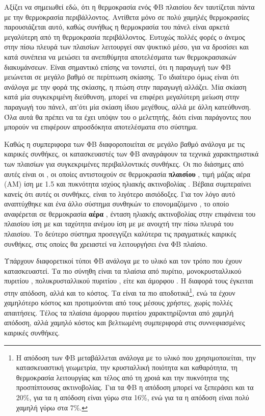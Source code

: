 \documentclass[12pt]{report}
\begin{document}
Αξίζει να σημειωθεί εδώ, ότι η θερμοκρασία ενός ΦΒ πλαισίου δεν ταυτίζεται πάντα με την θερμοκρασία περιβάλλοντος. Αντίθετα μόνο σε πολύ χαμηλές θερμοκρασίες παρουσιάζεται αυτό, καθώς συνήθως η θερμοκρασία του πάνελ είναι αρκετά 
μεγαλύτερη από τη θερμοκρασία περιβάλλοντος. Ευτυχώς πολλές φορές ο άνεμος στην πίσω πλευρά των πλαισίων λειτουργεί σαν ψυκτικό μέσο, για να δροσίσει και κατά συνέπεια να μειώσει τα ανεπιθύμητα αποτελέσματα των θερμοκρασιακών 
διακυμάνσεων. Είναι σημαντικό επίσης να τονιστεί, ότι η παραγωγή των ΦΒ μειώνεται σε μεγάλο βαθμό σε περίπτωση σκίασης. Το ιδιαίτερο όμως είναι ότι ανάλογα με την φορά της σκίασης, η πτώση στην παραγωγή αλλάζει. Μία σκίαση κατά μία 
συγκεκριμένη διεύθυνση, μπορεί να επιφέρει μεγαλύτερη μείωση στην παραγωγή του πάνελ, απ'ότι μία σκίαση ίδιου μεγέθους, αλλά με άλλη κατεύθυνση. Όλα αυτά θα πρέπει να τα έχει υπόψιν του ο μελετητής, διότι είναι παράγοντες που μπορούν
να επιφέρουν απροσδόκητα αποτελέσματα στο σύστημα. 

Καθώς η συμπεριφορα των ΦΒ διαφοροποιείται σε μεγάλο βαθμό ανάλογα με τις καιρικές συνθήκες, οι κατασκευαστές των ΦΒ αναγράφουν τα τεχνικά χαρακτηριστικά των πλαισίων για συγκεκριμένες περιβαλλοντικές συνθήκες. Οι πιο διάσημες
από αυτές είναι οι {}, οι οποίες αντιστοιχούν σε θερμοκρασία \textbf{πλαισίου} {}, τιμή μάζας αέρα (ΑΜ) ίση με 1.5 και πυκνότητα ισχύος ηλιακής ακτινοβολίας 
{}. Βέβαια συμπεραίνει κανείς ότι αυτές οι συνθήκες, είναι το λιγότερο αισιόδοξες. Για τον λόγο αυτό αναπτύχθηκε και ένα άλλο σύστημα συνθηκών το επονομαζόμενο 
{}, το οποίο αναφέρεται σε θερμοκρασία \textbf{αέρα} {}, ένταση ηλιακής ακτινοβολίας στην επιφάνεια του πλαισίου ίση με {} 
και ταχύτητα ανέμου ίση με {} με ανοιχτή την πίσω πλευρά του πλαισίου. Το δεύτερο σύστημα προσεγγίζει καλύτερα τις πραγματικές καιρικές συνθήκες, στις οποίες θα χρειαστεί να λειτουργήσει ένα ΦΒ πλαίσιο. 

Υπάρχουν διαφορετικοί τύποι ΦΒ ανάλογα με το υλικό και τον τρόπο που έχουν κατασκευαστεί. Τα πιο σύνηθη είναι τα πλαίσια από πυρίτιο, μονοκρυσταλλικού πυριτίου {}, πολυκρυσταλλικού πυριτίου {}, 
είτε και άμορφου {}. Η διαφορά τους έγκειται στην απόδοση, αλλά και το κόστος. Τα {} είναι τα πιο αποδοτικά\footnote{Η απόδοση των ΦΒ μεταβάλλεται ανάλογα με το υλικό που χρησιμοποιείται, την
κατασκευαστική γεωμετρία, την κρυσταλλική ποιότητα και καθαρότητα, τη θερμοκρασία λειτουργίας και τέλος από τη χροιά και την πυκνότητα της προσπίπτουσας ακτινοβολίας. Για τα {}
ΦΒ η απόδοση μπορεί να ξεπεράσει και τα 20\%, για τα {} η απόδοση είναι γύρω στα 16\%, ενώ για τα {} η απόδοση είναι πολύ χαμηλή γύρω στα 7\%.}, ενώ τα {} έχουν χαμηλότερο
κόστος και προτιμούνται από τους μέσους χρήστες, χωρίς πολλές απαιτήσεις. Τέλος τα πλαίσια άμορφου πυριτίου χαρακτηρίζονται από χαμηλή απόδοση, αλλά χαμηλό κόστος και βελτιωμένη συμπεριφορά στις συννεφιασμένες καιρικές συνθήκες.
\end{document}
